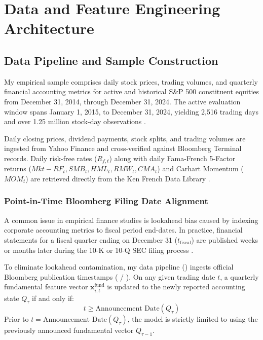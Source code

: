 \chapter{Data and Feature Engineering Architecture}
\label{ch:data_and_features}

\section{Data Pipeline and Sample Construction}
My empirical sample comprises daily stock prices, trading volumes, and quarterly financial accounting metrics for active and historical S\&P 500 constituent equities from December 31, 2014, through December 31, 2024. The active evaluation window spans January 1, 2015, to December 31, 2024, yielding 2,516 trading days and over 1.25 million stock-day observations \citep{gu2020empirical}.

Daily closing prices, dividend payments, stock splits, and trading volumes are ingested from Yahoo Finance and cross-verified against Bloomberg Terminal records. Daily risk-free rates ($R_{f,t}$) along with daily Fama-French 5-Factor returns ($Mkt-RF_t, SMB_t, HML_t, RMW_t, CMA_t$) and Carhart Momentum ($MOM_t$) are retrieved directly from the Ken French Data Library \citep{fama1993common, fama2015five, carhart1997on}.

\subsection{Point-in-Time Bloomberg Filing Date Alignment}
A common issue in empirical finance studies is lookahead bias caused by indexing corporate accounting metrics to fiscal period end-dates. In practice, financial statements for a fiscal quarter ending on December 31 ($t_{\text{fiscal}}$) are published weeks or months later during the 10-K or 10-Q SEC filing process \citep{lopez2018advances}.

To eliminate lookahead contamination, my data pipeline () ingests official Bloomberg publication timestamps ( / ). On any given trading date $t$, a quarterly fundamental feature vector $\mathbf{x}_{i,t}^{\text{fund}}$ is updated to the newly reported accounting state $Q_{\tau}$ if and only if:
\begin{equation}
t \ge \text{Announcement Date}(Q_{\tau})
\end{equation}
Prior to $t = \text{Announcement Date}(Q_{\tau})$, the model is strictly limited to using the previously announced fundamental vector $Q_{\tau-1}$.

